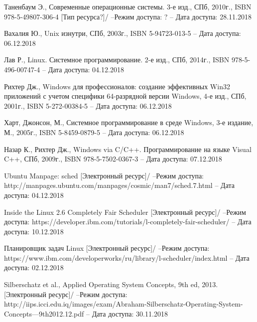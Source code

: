 \newpage
\begin{thebibliography}{3}

	 Таненбаум Э., Современные операционные системы. 3-е изд., СПб, 2010г., ISBN 978-5-49807-306-4 [Тип ресурса?]/ --Режим доступа: ? -- Дата доступа: 28.11.2018 %

	 Вахалия Ю., Unix изнутри, СПб, 2003г., ISBN 5-94723-013-5 -- Дата доступа: 06.12.2018

	 Лав Р., Linux. Системное программирование. 2-е изд., СПб, 2014г., ISBN 978-5-496-00747-4  -- Дата доступа: 04.12.2018
	
	 Рихтер Дж., Windows для профессионалов: создание эффективных Win32 приложений с учетом специфики 64-разрядной версии Windows, 4-е изд., СПб, 2001г., ISBN 5-272-00384-5 -- Дата доступа: 06.12.2018

	 Харт, Джонсон, М., Системное программирование в среде Windows, 3-е издание, М., 2005г., ISBN 5-8459-0879-5 -- Дата доступа: 06.12.2018 %
	
	 Назар К., Рихтер Дж., Windows via C/C++. Программирование на языке Visual C++, СПб, 2009г., ISBN 978-5-7502-0367-3 -- Дата доступа: 07.12.2018  

	 Ubuntu Manpage: sched [Электронный ресурс]/ --Режим доступа: http://manpages.ubuntu.com/manpages/cosmic/man7/sched.7.html -- Дата доступа: 04.12.2018
	
	 Inside the Linux 2.6 Completely Fair Scheduler [Электронный ресурс]/ --Режим доступа:  https://developer.ibm.com/tutorials/l-completely-fair-scheduler/ -- Дата доступа: 10.12.2018
	
	 Планировщик задач Linux [Электронный ресурс]/ --Режим доступа:  https://www.ibm.com/developerworks/ru/library/l-scheduler/index.html -- Дата доступа: 02.12.2018
	
	 Silberschatz et al., Applied Operating System Concepts, 9th ed, 2013. [Электронный ресурс]/ --Режим доступа:  http://iips.icci.edu.iq/images/exam/Abraham-Silberschatz-Operating-System-Concepts---9th2012.12.pdf -- Дата доступа: 30.11.2018
	\end{thebibliography}

